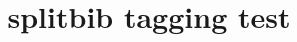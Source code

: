 \documentclass{article}
\title{splitbib tagging test}
\begin{document}
\cite{article-full}

\cite{book-minimal}



\end{document}

